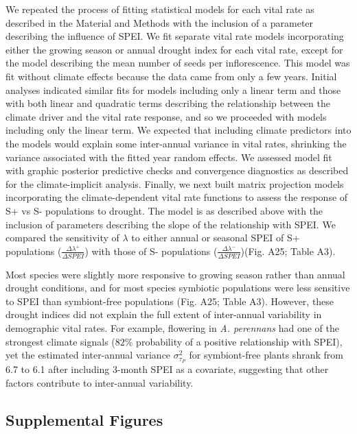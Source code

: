 \documentclass[9pt,twoside,lineno]{pnas-new}
\begin{document}
{We repeated the process of fitting statistical models for each vital rate as described in the Material and Methods with the inclusion of a parameter describing the influence of SPEI. 
We fit separate vital rate models incorporating either the growing season or annual drought index for each vital rate, except for the model describing the mean number of seeds per inflorescence. 
This model was fit without climate effects because the data came from only a few years.
Initial analyses indicated similar fits for models including only a linear term and those with both linear and quadratic terms describing the relationship between the climate driver and the vital rate response, and so we proceeded with models including only the linear term.
We expected that including climate predictors into the models would explain some inter-annual variance in vital rates, shrinking the variance associated with the fitted year random effects.
We assessed model fit with graphic posterior predictive checks and convergence diagnostics as described for the climate-implicit analysis. 
Finally, we next built matrix projection models incorporating the climate-dependent vital rate functions to assess the response of S+ vs S- populations to drought. 
The model is as described above with the inclusion of parameters describing the slope of the relationship with SPEI. 
We compared the sensitivity of $\lambda$ to either annual or seasonal SPEI of S+ populations ($\frac{\Delta\lambda^{+}}{\Delta SPEI}$) with those of S- populations ($\frac{\Delta\lambda^{-}}{\Delta SPEI}$)(Fig. A25; Table A3).

Most species were slightly more responsive to growing season rather than annual drought conditions, and for most species symbiotic populations were less sensitive to SPEI than symbiont-free populations (Fig. A25; Table A3).
However, these drought indices did not explain the full extent of inter-annual variability in demographic vital rates.
For example, flowering in \emph{A. perennans} had one of the strongest climate signals ($82\%$ probability of a positive relationship with SPEI), yet the estimated inter-annual variance $\sigma^2_{\tau_{P}}$ for symbiont-free plants shrank from 6.7 to 6.1 after including 3-month SPEI as a covariate, suggesting that other factors contribute to inter-annual variability.
}
\newpage



\subsection*{Supplemental Figures}
\end{document}
